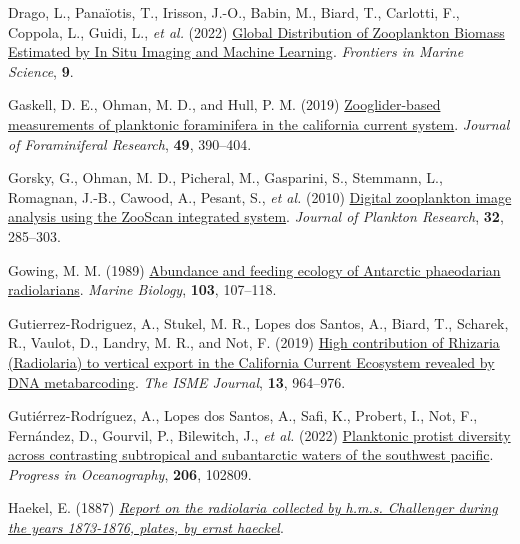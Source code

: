 \documentclass[
]{article}
\newlength{\cslhangindent}
\newlength{\cslentryspacingunit} %
\newenvironment{CSLReferences}[2] %
 {%
  \setlength{\parindent}{0pt}
  \ifodd #1
  \let\oldpar\par
  \def\par{\hangindent=\cslhangindent\oldpar}
  \fi
  \setlength{\parskip}{#2\cslentryspacingunit}
 }%
 {}
\begin{document}
\begin{CSLReferences}{1}{0}
\leavevmode{}%
Drago, L., Panaïotis, T., Irisson, J.-O., Babin, M., Biard, T.,
Carlotti, F., Coppola, L., Guidi, L., \emph{et al.} (2022)
\href{https://doi.org/10.3389/fmars.2022.894372}{Global Distribution of
Zooplankton Biomass Estimated by In Situ Imaging and Machine Learning}.
\emph{Frontiers in Marine Science}, \textbf{9}.

\leavevmode{}%
Gaskell, D. E., Ohman, M. D., and Hull, P. M. (2019)
\href{https://doi.org/10.2113/gsjfr.49.4.390}{Zooglider-based
measurements of planktonic foraminifera in the california current
system}. \emph{Journal of Foraminiferal Research}, \textbf{49},
390--404.

\leavevmode{}%
Gorsky, G., Ohman, M. D., Picheral, M., Gasparini, S., Stemmann, L.,
Romagnan, J.-B., Cawood, A., Pesant, S., \emph{et al.} (2010)
\href{https://doi.org/10.1093/plankt/fbp124}{Digital zooplankton image
analysis using the ZooScan integrated system}. \emph{Journal of Plankton
Research}, \textbf{32}, 285--303.

\leavevmode{}%
Gowing, M. M. (1989) \href{https://doi.org/10.1007/BF00391069}{Abundance
and feeding ecology of Antarctic phaeodarian radiolarians}. \emph{Marine
Biology}, \textbf{103}, 107--118.

\leavevmode{}%
Gutierrez-Rodriguez, A., Stukel, M. R., Lopes dos Santos, A., Biard, T.,
Scharek, R., Vaulot, D., Landry, M. R., and Not, F. (2019)
\href{https://doi.org/10.1038/s41396-018-0322-7}{High contribution of
Rhizaria (Radiolaria) to vertical export in the California Current
Ecosystem revealed by DNA metabarcoding}. \emph{The ISME Journal},
\textbf{13}, 964--976.

\leavevmode{}%
Gutiérrez-Rodríguez, A., Lopes dos Santos, A., Safi, K., Probert, I.,
Not, F., Fernández, D., Gourvil, P., Bilewitch, J., \emph{et al.} (2022)
\href{https://doi.org/10.1016/j.pocean.2022.102809}{Planktonic protist
diversity across contrasting subtropical and subantarctic waters of the
southwest pacific}. \emph{Progress in Oceanography}, \textbf{206},
102809.

\leavevmode{}%
Haekel, E. (1887)
\emph{\href{https://www.gutenberg.org/cache/epub/44527/pg44527-images.html}{Report
on the radiolaria collected by h.m.s. Challenger during the years
1873-1876, plates, by ernst haeckel}}.


\end{CSLReferences}
\end{document}
